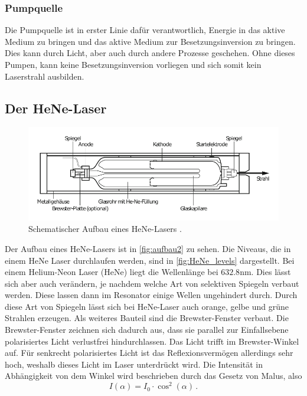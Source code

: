 \subsubsection*{Pumpquelle}
Die Pumpquelle ist in erster Linie dafür verantwortlich, Energie in das aktive Medium zu bringen und das aktive Medium zur Besetzungsinversion zu bringen.
Dies kann durch Licht, aber auch durch andere Prozesse geschehen.
Ohne dieses Pumpen, kann keine Besetzungsinversion vorliegen und sich somit kein Laserstrahl ausbilden.

\subsection{Der HeNe-Laser}
\begin{figure}
    \centering
    \includegraphics[width = 0.7 \linewidth]{pictures/aufbau2.pdf}
    \caption{Schematischer Aufbau eines HeNe-Lasers \cite{HeNe_levels}.}
    \label{fig:aufbau2}
\end{figure}
Der Aufbau eines HeNe-Lasers ist in \autoref{fig:aufbau2} zu sehen.
Die Niveaus, die in einem HeNe Laser durchlaufen werden, sind in \autoref{fig:HeNe_levels} dargestellt.
Bei einem Helium-Neon Laser (HeNe) liegt die Wellenlänge bei $632.8 \unit{\nano\meter}$.
Dies lässt sich aber auch verändern, je nachdem welche Art von selektiven Spiegeln verbaut werden.
Diese lassen dann im Resonator einige Wellen ungehindert durch.
Durch diese Art von Spiegeln lässt sich bei HeNe-Laser auch orange, gelbe und grüne Strahlen erzeugen. 
Als weiteres Bauteil sind die Brewster-Fenster verbaut.
Die Brewster-Fenster zeichnen sich dadurch aus, dass sie parallel zur Einfallsebene polarisiertes Licht verlustfrei hindurchlassen.
Das Licht trifft im Brewster-Winkel auf.
Für senkrecht polarisiertes Licht ist das Reflexionsvermögen allerdings sehr hoch, weshalb dieses Licht im Laser unterdrückt wird.
Die Intensität in Abhängigkeit von dem Winkel wird beschrieben durch das Gesetz von Malus, also
\begin{equation} \label{eq:malus}
    I(\alpha) = I_0 \cdot \cos^2(\alpha) \, .
\end{equation}